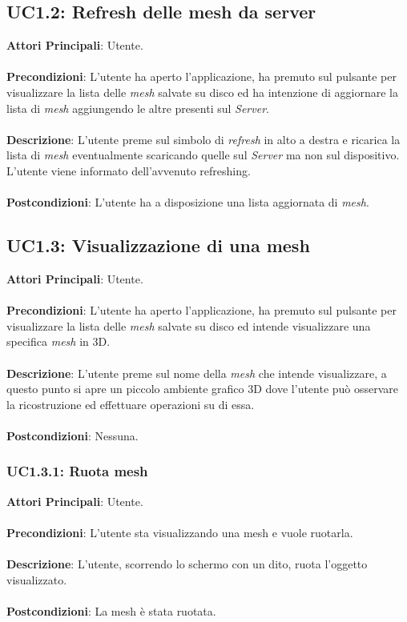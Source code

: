 \subsection{UC1.2: Refresh delle mesh da server}
\textbf{Attori Principali}: Utente.
\\\\ \textbf{Precondizioni}: L'utente ha aperto l'applicazione, ha premuto sul pulsante per visualizzare la lista delle \emph{mesh} salvate su disco ed ha intenzione di aggiornare la lista di \emph{mesh} aggiungendo le altre presenti sul \emph{Server}.
\\\\ \textbf{Descrizione}: L'utente preme sul simbolo di \emph{refresh} in alto a destra e ricarica la lista di \emph{mesh} eventualmente scaricando quelle sul \emph{Server} ma non sul dispositivo. L'utente viene informato dell'avvenuto refreshing.
\\\\ \textbf{Postcondizioni}: L'utente ha a disposizione una lista aggiornata di \emph{mesh}.

\subsection{UC1.3: Visualizzazione di una mesh}
\textbf{Attori Principali}: Utente.
\\\\ \textbf{Precondizioni}: L'utente ha aperto l'applicazione, ha premuto sul pulsante per visualizzare la lista delle \emph{mesh} salvate su disco ed intende visualizzare una specifica \emph{mesh} in 3D.
\\\\ \textbf{Descrizione}: L'utente preme sul nome della \emph{mesh} che intende visualizzare, a questo punto si apre un piccolo ambiente grafico 3D dove l'utente può osservare la ricostruzione ed effettuare operazioni su di essa.
\\\\ \textbf{Postcondizioni}: Nessuna.

\subsubsection{UC1.3.1: Ruota mesh}
\textbf{Attori Principali}: Utente.
\\\\ \textbf{Precondizioni}: L'utente sta visualizzando una mesh e vuole ruotarla.
\\\\ \textbf{Descrizione}: L'utente, scorrendo lo schermo con un dito, ruota l'oggetto visualizzato.
\\\\ \textbf{Postcondizioni}: La mesh è stata ruotata.

